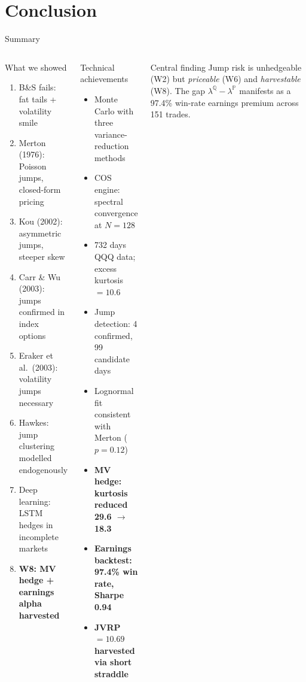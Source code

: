 \documentclass[aspectratio=169,10pt]{beamer}
\begin{document}
\section{Conclusion}

\begin{frame}{Summary}
\begin{columns}[T]
\begin{block}{What we showed}
\footnotesize
\begin{enumerate}\itemsep2pt
  \item B\&S fails: fat tails + volatility smile
  \item Merton (1976): Poisson jumps, closed-form pricing
  \item Kou (2002): asymmetric jumps, steeper skew
  \item Carr \& Wu (2003): jumps confirmed in index options
  \item Eraker et al.\ (2003): volatility jumps necessary
  \item Hawkes: jump clustering modelled endogenously
  \item Deep learning: LSTM hedges in incomplete markets
  \item \textbf{W8: MV hedge + earnings alpha harvested}
\end{enumerate}
\end{block}

\begin{block}{Technical achievements}
\footnotesize
\begin{itemize}\itemsep2pt
  \item Monte Carlo with three variance-reduction methods
  \item COS engine: spectral convergence at $N=128$
  \item 732 days QQQ data; excess kurtosis $= 10.6$
  \item Jump detection: 4 confirmed, 99 candidate days
  \item Lognormal fit consistent with Merton ($p=0.12$)
  \item \textbf{MV hedge: kurtosis reduced 29.6 $\to$ 18.3}
  \item \textbf{Earnings backtest: 97.4\% win rate, Sharpe 0.94}
  \item \textbf{JVRP $= 10.69$ harvested via short straddle}
\end{itemize}
\end{block}

\begin{alertblock}{Central finding}
\footnotesize Jump risk is unhedgeable (W2) but \emph{priceable} (W6) and \emph{harvestable} (W8). The gap $\lambda^{\mathbb{Q}} - \lambda^{\mathbb{P}}$ manifests as a 97.4\% win-rate earnings premium across 151 trades.
\end{alertblock}
\end{columns}
\end{frame}
\end{document}
